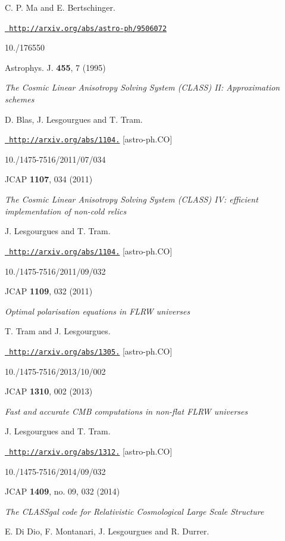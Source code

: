 \begin{DoxyItemize}
\begin{DoxyItemize}
C. P. Ma and E. Bertschinger.

\href{http://arxiv.org/abs/astro-ph/9506072}{\texttt{ http\+://arxiv.\+org/abs/astro-\/ph/9506072}}

10./176550

Astrophys. J. {\bfseries{455}}, 7 (1995)
\item {\itshape The Cosmic Linear Anisotropy Solving System (CLASS) II\+: Approximation schemes}

D. Blas, J. Lesgourgues and T. Tram.

\href{http://arxiv.org/abs/1104.2933}{\texttt{ http\+://arxiv.\+org/abs/1104.}} \mbox{[}astro-\/ph.\+CO\mbox{]}

10./1475-\/7516/2011/07/034

JCAP {\bfseries{1107}}, 034 (2011)
\item {\itshape The Cosmic Linear Anisotropy Solving System (CLASS) IV\+: efficient implementation of non-\/cold relics}

J. Lesgourgues and T. Tram.

\href{http://arxiv.org/abs/1104.2935}{\texttt{ http\+://arxiv.\+org/abs/1104.}} \mbox{[}astro-\/ph.\+CO\mbox{]}

10./1475-\/7516/2011/09/032

JCAP {\bfseries{1109}}, 032 (2011)
\item {\itshape Optimal polarisation equations in FLRW universes}

T. Tram and J. Lesgourgues.

\href{http://arxiv.org/abs/1305.3261}{\texttt{ http\+://arxiv.\+org/abs/1305.}} \mbox{[}astro-\/ph.\+CO\mbox{]}

10./1475-\/7516/2013/10/002

JCAP {\bfseries{1310}}, 002 (2013)
\item {\itshape Fast and accurate CMB computations in non-\/flat FLRW universes}

J. Lesgourgues and T. Tram.

\href{http://arxiv.org/abs/1312.2697}{\texttt{ http\+://arxiv.\+org/abs/1312.}} \mbox{[}astro-\/ph.\+CO\mbox{]}

10./1475-\/7516/2014/09/032

JCAP {\bfseries{1409}}, no. 09, 032 (2014)
\item {\itshape The CLASSgal code for Relativistic Cosmological Large Scale Structure}

E. Di Dio, F. Montanari, J. Lesgourgues and R. Durrer.


\end{DoxyItemize}
\end{DoxyItemize}
